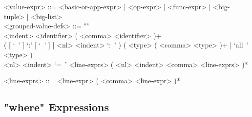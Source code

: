 \documentclass[diploma]{softlab-thesis}
\begin{document}
\begin{itemize}
\begin{grammar}
<value-expr> ::=
<basic-or-app-expr> | <op-expr> | <func-expr> | <big-tuple> | <big-list>
\\

<grouped-value-defs> ::= ""\\
<indent> <identifier> ( <comma> <identifier> )+ \\
( [ `\ ' ] `:' [ `\ ' ] | <nl> <indent> `:\ ' )
( <type> ( <comma> <type> )+ | `all\ ' <type> ) \\
<nl> <indent> `=\ ' <line-exprs> ( <nl> <indent> <comma> <line-exprs> )*

<line-exprs> ::= <line-expr> ( <comma> <line-expr> )*
\end{grammar}

\end{itemize}

\newpage

\subsection{"where" Expressions}
\label{subsubsec:whereexprs}
\end{document}
